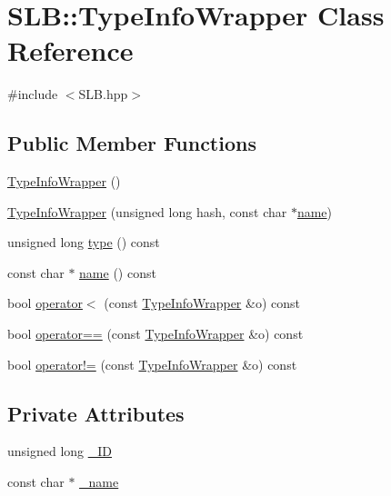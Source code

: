 \hypertarget{classSLB_1_1TypeInfoWrapper}{}\section{S\+LB\+:\+:Type\+Info\+Wrapper Class Reference}
\label{classSLB_1_1TypeInfoWrapper}


{\ttfamily \#include $<$S\+L\+B.\+hpp$>$}

\subsection*{Public Member Functions}
\begin{DoxyCompactItemize}
\item 
\hyperlink{classSLB_1_1TypeInfoWrapper_ad38b0949bc7273cfe6a95cf2f5a178bf}{Type\+Info\+Wrapper} ()
\item 
\hyperlink{classSLB_1_1TypeInfoWrapper_a67accb0e650b50ed7b1da22cb4b0bea8}{Type\+Info\+Wrapper} (unsigned long hash, const char $\ast$\hyperlink{classSLB_1_1TypeInfoWrapper_ac2346156cc8779e8e1f26327319a1c8c}{name})
\item 
unsigned long \hyperlink{classSLB_1_1TypeInfoWrapper_a0b3a02e34f47c6896779701ff4d74dc8}{type} () const 
\item 
const char $\ast$ \hyperlink{classSLB_1_1TypeInfoWrapper_ac2346156cc8779e8e1f26327319a1c8c}{name} () const 
\item 
bool \hyperlink{classSLB_1_1TypeInfoWrapper_a447c99339f10f90bd3713244414b9f58}{operator$<$} (const \hyperlink{classSLB_1_1TypeInfoWrapper}{Type\+Info\+Wrapper} \&o) const 
\item 
bool \hyperlink{classSLB_1_1TypeInfoWrapper_a0ee4cb7f6e836752805244f991337624}{operator==} (const \hyperlink{classSLB_1_1TypeInfoWrapper}{Type\+Info\+Wrapper} \&o) const 
\item 
bool \hyperlink{classSLB_1_1TypeInfoWrapper_a0b49840ac259381718ea8e1d59773ea6}{operator!=} (const \hyperlink{classSLB_1_1TypeInfoWrapper}{Type\+Info\+Wrapper} \&o) const 
\end{DoxyCompactItemize}
\subsection*{Private Attributes}
\begin{DoxyCompactItemize}
\item 
unsigned long \hyperlink{classSLB_1_1TypeInfoWrapper_a1ac4759ba0f06245834ec5627445b64b}{\+\_\+\+ID}
\item 
const char $\ast$ \hyperlink{classSLB_1_1TypeInfoWrapper_a5b558bd25bd1b9ed34e7d830e85b27fb}{\+\_\+name}
\end{DoxyCompactItemize}


